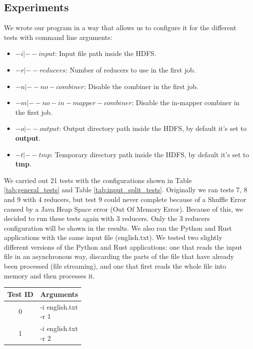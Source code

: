 \documentclass{article}
\begin{document}
\begin{multicols}{2}
\section{Experiments}
    We wrote our program in a way that allows us to configure it for the different tests with 
    command line arguments:
    \begin{itemize}
        \item \textbf{$-i|--input$}: Input file path inside the HDFS.
        \item \textbf{$-r|--reducers$}: Number of reducers to use in the first job.
        \item \textbf{$-n|--no-combiner$}: Disable the combiner in the first job.
        \item \textbf{$-m|--no-in-mapper-combiner$}: Disable the in-mapper combiner in the first job.
        \item \textbf{$-o|--output$}: Output directory path inside the HDFS, 
        by default it's set to \textbf{output}.
        \item \textbf{$-t|--tmp$}: Temporary directory path inside the HDFS,
        by default it's set to \textbf{tmp}.
    \end{itemize}
    We carried out 21 tests with the configurations shown in 
    Table \ref{tab:general_tests} and Table \ref{tab:input_split_tests}.
    Originally we ran tests 7, 8 and 9 with 4 reducers, but test 9 could never complete because of a 
    Shuffle Error caused by a Java Heap Space error (Out Of Memory Error). Because of this, 
    we decided to run these tests again with 3 reducers.
    Only the 3 reducers configuration will be shown in the results.
    We also ran the Python and Rust applications with the same input file (english.txt).
    We tested two slightly different versions of the Python and Rust applications: one that reads the
    input file in an asynchronous way, discarding the parts of the file that have already been processed (file streaming),
    and one that first reads the whole file into memory and then processes it.
    \begin{table}[H]
        \centering
        \begin{tabular}{|c|l|}
            \hline
            Test ID & Arguments \\
            \hline
            0 & \makecell[l]{-i english.txt \\ -r 1} \\        
            \hline
            1 & \makecell[l]{-i english.txt \\ -r 2} \\        

\end{tabular}
\end{table}
\end{multicols}
\end{document}
